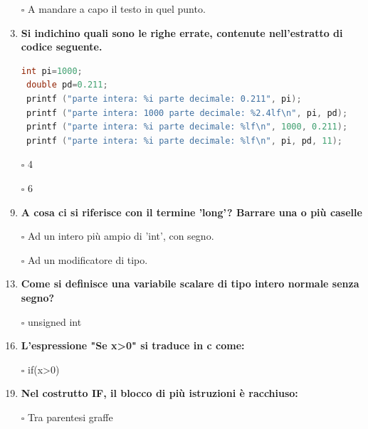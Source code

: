 \documentclass[11pt]{article}
\begin{document}
\begin{enumerate}
\item[$\square$]  A mandare a capo il testo in quel punto.



\item [\nonumber]
\item {\bf Si indichino quali sono le righe errate, contenute nell'estratto di codice seguente.}
\item [\nonumber]
\item [\nonumber]

 \begin{lstlisting}[language=c]
 int pi=1000;
 double pd=0.211;
 printf ("parte intera: %i parte decimale: 0.211", pi);
 printf ("parte intera: 1000 parte decimale: %2.4lf\n", pi, pd);
 printf ("parte intera: %i parte decimale: %lf\n", 1000, 0.211);
 printf ("parte intera: %i parte decimale: %lf\n", pi, pd, 11);
 \end{lstlisting}
\item[$\square$] 4
\item[$\square$] 6

\item [\nonumber]
\item{\bf A cosa ci si riferisce con il termine 'long'? Barrare una o pi\`{u} caselle}

\item[$\square$] Ad un intero pi\`{u} ampio di 'int', con segno.
\item[$\square$] Ad un modificatore di tipo.

\item [\nonumber]
 \item {\bf Come si definisce una variabile scalare di tipo intero normale senza segno?}
 
\item[$\square$] unsigned int

\item [\nonumber]

\item {\bf L'espressione "Se x>0" si traduce in c come:}
\item[$\square$]  if(x>0)

\item [\nonumber]
\item {\bf Nel costrutto IF, il blocco di pi\`{u} istruzioni \`{e} racchiuso:}
\item[$\square$]  Tra parentesi graffe 

\item [\nonumber]


\end{enumerate}
\end{document}
